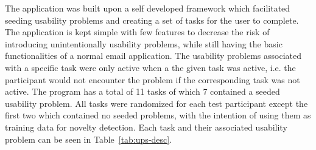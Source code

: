 The application was built upon a self developed framework which facilitated seeding usability problems and creating a set of tasks for the user to complete. 
The application is kept simple with few features to decrease the risk of introducing unintentionally usability problems, while still having the basic functionalities of a normal email application.  
The usability problems associated with a specific task were only active when a the given task was active, i.e. the participant would not encounter the problem if the corresponding task was not active.
The program has a total of 11 tasks of which 7 contained a seeded usability problem. 
All tasks were randomized for each test participant except the first two which contained no seeded problems, with the
intention of using them as training data for novelty detection. 
Each task and their associated usability problem can be seen in Table~\ref{tab:ups-desc}.

